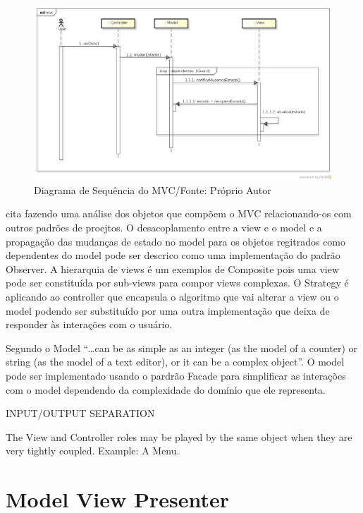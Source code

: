 \begin{figure}[h]
	\centering
	\includegraphics[scale=0.5]{img/mvc_seq.png}
	\caption{Diagrama de Sequência do MVC/Fonte: Próprio Autor}
	\label{mvc_seq}
\end{figure}

 cita  fazendo uma análise dos
objetos que compõem o MVC relacionando-os com outros padrões de proejtos. O
desacoplamento entre a view e o model e a propagação das mudanças de estado no
model para os objetos regitrados como dependentes do model pode ser descrico
como uma implementação do padrão Observer. A hierarquia de views é um exemplos
de Composite pois uma view pode ser constituída por sub-views para compor views
complexas. O Strategy é aplicando ao controller que encapsula o algoritmo que
vai alterar a view ou o model podendo ser substituído por uma outra
implementação que deixa de responder às interações com o usuário.

Segundo  o Model ``\ldots can be as simple as an integer
(as the model of a counter) or string (as the model of a text editor), or it can
be a complex object''. O model pode ser implementado usando o pardrão Facade
para simplificar as interações com o model dependendo da complexidade do
domínio que ele representa.

  INPUT/OUTPUT SEPARATION

The View and Controller roles may be played by the 
same object when they are very tightly coupled. 
Example: A Menu.


\section{Model View Presenter}

